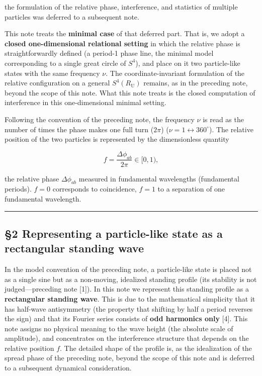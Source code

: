 \documentclass[
]{article}
\begin{document}
the formulation of the relative phase, interference, and statistics of
multiple particles was deferred to a subsequent note.

This note treats the \textbf{minimal case} of that deferred part. That
is, we adopt a \textbf{closed one-dimensional relational setting} in
which the relative phase is straightforwardly defined (a period-1 phase
line, the minimal model corresponding to a single great circle of
\(S^4\)), and place on it two particle-like states with the same
frequency \(\nu\). The coordinate-invariant formulation of the relative
configuration on a general \(S^4(R_{\mathrm U})\) remains, as in the
preceding note, beyond the scope of this note. What this note treats is
the closed computation of interference in this one-dimensional minimal
setting.

Following the convention of the preceding note, the frequency \(\nu\) is
read as the number of times the phase makes one full turn (\(2\pi\))
(\(\nu=1\leftrightarrow360^\circ\)). The relative position of the two
particles is represented by the dimensionless quantity

\[f=\frac{\Delta\phi_{ab}}{2\pi}\in[0,1),\]

the relative phase \(\Delta\phi_{ab}\) measured in fundamental
wavelengths (fundamental periods). \(f=0\) corresponds to coincidence,
\(f=1\) to a separation of one fundamental wavelength.

\begin{center}\rule{0.5\linewidth}{0.5pt}\end{center}

\subsection{§2 Representing a particle-like state as a rectangular
standing
wave}\label{representing-a-particle-like-state-as-a-rectangular-standing-wave}

In the model convention of the preceding note, a particle-like state is
placed not as a single sine but as a non-moving, idealized standing
profile (its stability is not judged---preceding note {[}1{]}). In this
note we represent this standing profile as a \textbf{rectangular
standing wave}. This is due to the mathematical simplicity that it has
half-wave antisymmetry (the property that shifting by half a period
reverses the sign) and that its Fourier series consists of \textbf{odd
harmonics only} {[}4{]}. This note assigns no physical meaning to the
wave height (the absolute scale of amplitude), and concentrates on the
interference structure that depends on the relative position \(f\). The
detailed shape of the profile is, as the idealization of the spread
phase of the preceding note, beyond the scope of this note and is
deferred to a subsequent dynamical consideration.
\end{document}
